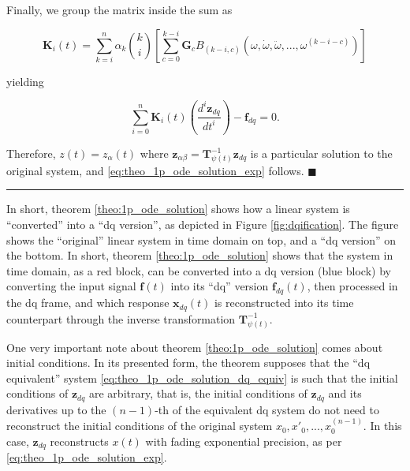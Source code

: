 	Finally, we group the matrix inside the sum as

\begin{equation} \mathbf{K}_i(t) = \sum\limits_{k=i}^{n} \alpha_k{k\choose i} \left[\sum\limits_{c=0}^{k-i} \mathbf{G}_c B_{\left(k-i,c\right)}\left(\omega,\dot{\omega},\ddot{\omega},...,\omega^{(k-i-c)}\right) \right] \end{equation}

	yielding

\begin{equation} \sum\limits_{i=0}^n \mathbf{K}_i(t) \left(\dfrac{d^i \mathbf{z}_{dq}}{dt^i }\right) - \mathbf{f}_{dq} = 0 .\end{equation}

	Therefore, $z(t) = z_\alpha(t)$ where $\mathbf{z}_{\alpha\beta} = \mathbf{T}^{-1}_{\psi(t)}\mathbf{z}_{dq}$ is a particular solution to the original system, and \eqref{eq:theo_1p_ode_solution_exp} follows. \hfill$\blacksquare$

\vspace{5mm}
\hrule
\vspace{5mm}

	In short, theorem \ref{theo:1p_ode_solution} shows how a linear system is ``converted'' into a ``dq version'', as depicted in Figure \ref{fig:dqification}. The figure shows the ``original'' linear system in time domain on top, and a ``dq version'' on the bottom. In short, theorem \ref{theo:1p_ode_solution} shows that the system in time domain, as a red block, can be converted into a dq version (blue block) by converting the input signal $\mathbf{f}(t)$ into its ``dq'' version $\mathbf{f}_{dq}(t)$, then processed in the dq frame, and which response $\mathbf{x}_{dq}(t)$ is reconstructed into its time counterpart through the inverse transformation $\mathbf{T}^{-1}_{\psi(t)}$.

	One very important note about theorem \ref{theo:1p_ode_solution} comes about initial conditions. In its presented form, the theorem supposes that the ``dq equivalent'' system \eqref{eq:theo_1p_ode_solution_dq_equiv} is such that the initial conditions of $\mathbf{z}_{dq}$ are arbitrary, that is, the initial conditions of $\mathbf{z}_{dq}$ and its derivatives up to the $(n-1)$-th of the equivalent dq system do not need to reconstruct the initial conditions of the original system $x_0,x'_0,...,x^{(n-1)}_0$. In this case, $\mathbf{z}_{dq}$ reconstructs $x(t)$ with fading exponential precision, as per \eqref{eq:theo_1p_ode_solution_exp}.

